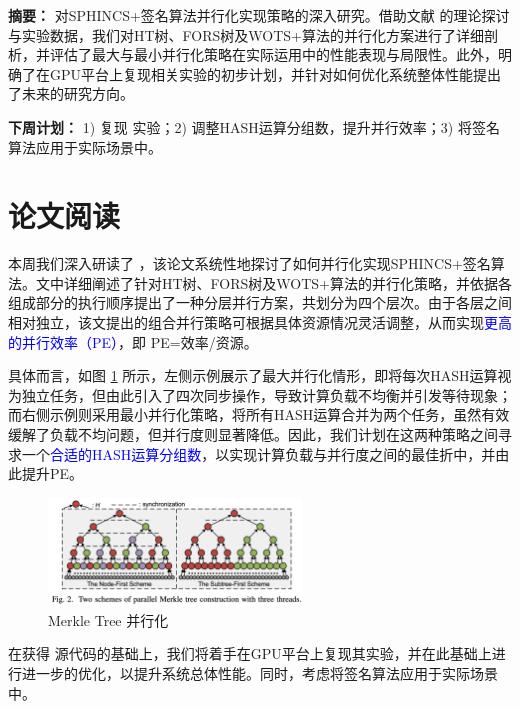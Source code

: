 \documentclass[report]{../../custom}
\begin{document}
\maketitle

\noindent \textbf{摘要：} 对SPHINCS+签名算法并行化实现策略的深入研究。借助文献 \cite{Wang2025} 的理论探讨与实验数据，我们对HT树、FORS树及WOTS+算法的并行化方案进行了详细剖析，并评估了最大与最小并行化策略在实际运用中的性能表现与局限性。此外，明确了在GPU平台上复现相关实验的初步计划，并针对如何优化系统整体性能提出了未来的研究方向。

\vskip 0.5cm

\noindent \textbf{下周计划：} 1) 复现 \cite{Wang2025} 实验；2) 调整HASH运算分组数，提升并行效率；3) 将签名算法应用于实际场景中。

\section{论文阅读}

本周我们深入研读了 \cite{Wang2025}，该论文系统性地探讨了如何并行化实现SPHINCS+签名算法。文中详细阐述了针对HT树、FORS树及WOTS+算法的并行化策略，并依据各组成部分的执行顺序提出了一种分层并行方案，共划分为四个层次。由于各层之间相对独立，该文提出的组合并行策略可根据具体资源情况灵活调整，从而实现\textcolor{blue}{更高的并行效率（PE）}，即 PE=效率/资源。

具体而言，如图 \ref{fig:merkle_tree_paralle} 所示，左侧示例展示了最大并行化情形，即将每次HASH运算视为独立任务，但由此引入了四次同步操作，导致计算负载不均衡并引发等待现象；而右侧示例则采用最小并行化策略，将所有HASH运算合并为两个任务，虽然有效缓解了负载不均问题，但并行度则显著降低。因此，我们计划在这两种策略之间寻求一个\textcolor{blue}{合适的HASH运算分组数}，以实现计算负载与并行度之间的最佳折中，并由此提升PE。

\begin{figure}[!ht]
\centering
\includegraphics[width=0.6\textwidth]{./fig/merkle_tree_paralle.png}
\caption{Merkle Tree 并行化\cite{Wang2025}}
\label{fig:merkle_tree_paralle}
\end{figure}

在获得 \cite{Wang2025} 源代码的基础上，我们将着手在GPU平台上复现其实验，并在此基础上进行进一步的优化，以提升系统总体性能。同时，考虑将签名算法应用于实际场景中。



\end{document}
